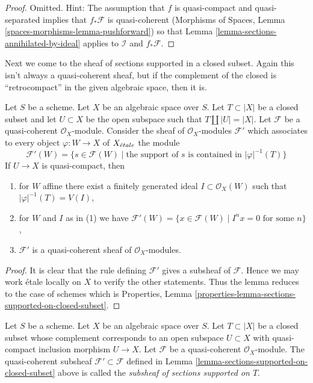 \begin{proof}
Omitted. Hint: The assumption that $f$ is quasi-compact and
quasi-separated implies that $f_*\mathcal{F}$ is quasi-coherent
(Morphisms of Spaces, Lemma \ref{spaces-morphisms-lemma-pushforward})
so that Lemma \ref{lemma-sections-annihilated-by-ideal} applies
to $\mathcal{I}$ and $f_*\mathcal{F}$.
\end{proof}

\noindent
Next we come to the sheaf of sections supported in a closed subset.
Again this isn't always a quasi-coherent sheaf, but if the complement
of the closed is ``retrocompact'' in the given algebraic space, then
it is.

\begin{lemma}
\label{lemma-sections-supported-on-closed-subset}
Let $S$ be a scheme. Let $X$ be an algebraic space over $S$.
Let $T \subset |X|$ be a closed subset and let $U \subset X$ be
the open subspace such that $T \amalg |U| = |X|$.
Let $\mathcal{F}$ be a quasi-coherent $\mathcal{O}_X$-module.
Consider the sheaf of $\mathcal{O}_X$-modules $\mathcal{F}'$
which associates to every object $\varphi : W \to X$ of
$X_{\acute{e}tale}$ the module
$$
\mathcal{F}'(W)
=
\{s \in \mathcal{F}(W) \mid
\text{the support of }s\text{ is contained in }|\varphi|^{-1}(T)\}
$$
If $U \to X$ is quasi-compact, then
\begin{enumerate}
\item for $W$ affine there exist a finitely generated
ideal $I \subset \mathcal{O}_X(W)$ such that $|\varphi|^{-1}(T) = V(I)$,
\item for $W$ and $I$ as in (1) we have
$\mathcal{F}'(W) = \{x \in \mathcal{F}(W) \mid
I^nx = 0 \text{ for some } n\}$,
\item $\mathcal{F}'$ is a quasi-coherent sheaf of $\mathcal{O}_X$-modules.
\end{enumerate}
\end{lemma}

\begin{proof}
It is clear that the rule defining $\mathcal{F}'$ gives a subsheaf
of $\mathcal{F}$. Hence we may work \'etale locally on $X$ to verify
the other statements. Thus the lemma reduces to the case of schemes
which is
Properties, Lemma \ref{properties-lemma-sections-supported-on-closed-subset}.
\end{proof}

\begin{definition}
\label{definition-subsheaf-sections-supported-on-closed}
Let $S$ be a scheme. Let $X$ be an algebraic space over $S$.
Let $T \subset |X|$ be a closed subset whose complement
corresponds to an open subspace $U \subset X$
with quasi-compact inclusion morphism $U \to X$.
Let $\mathcal{F}$ be a quasi-coherent $\mathcal{O}_X$-module.
The quasi-coherent subsheaf $\mathcal{F}' \subset \mathcal{F}$ defined in
Lemma \ref{lemma-sections-supported-on-closed-subset} above is called
the {\it subsheaf of sections supported on $T$}.
\end{definition}

